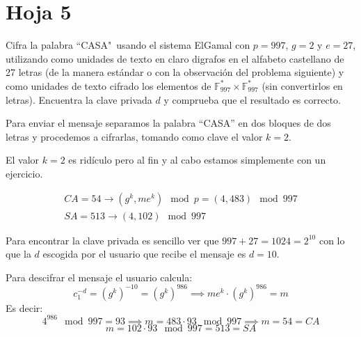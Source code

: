 \section{Hoja 5}
\begin{problem}[1]
Cifra la palabra ``CASA"\ usando el sistema ElGamal con  $p=997$, $g=2$ y $e=27$, utilizando como unidades de texto en claro digrafos  en el alfabeto castellano de 27 letras (de la manera estándar o con la observación del problema siguiente) y como unidades de texto cifrado los elementos de $\mathbb{F}_{997}^* \times \mathbb{F}_{997}^*$ (sin convertirlos en letras). Encuentra la clave privada $d$ y comprueba que el resultado es correcto.

\solution


Para enviar el mensaje separamos la palabra ``CASA'' en dos bloques de dos letras y procedemos a cifrarlas, tomando como clave el valor $k=2$. 

\obs El valor $k=2$ es ridículo pero al fin y al cabo estamos simplemente con un ejercicio.

\[\begin{array}{l} 
CA = 54 \to (g^k,me^k) \mod p = (4,483) \mod 997 \\
SA = 513 \to (4, 102) \mod 997
\end{array}\]

Para encontrar la clave privada es sencillo ver que $997+27 = 1024 = 2^{10}$ con lo que la $d$ escogida por el usuario que recibe el mensaje es $d=10$.

Para descifrar el mensaje el usuario calcula:
\[c_1^{-d} = (g^k)^{-10} =(g^k)^{986} \implies me^k\cdot (g^k)^{986} = m\]
Es decir:
\[4^{986} \mod 997 = 93 \implies m = 483 \cdot 93 \mod 997 \implies m=54 = CA\]
\[m = 102 \cdot 93 \mod 997 = 513 =SA\]

\end{problem}

